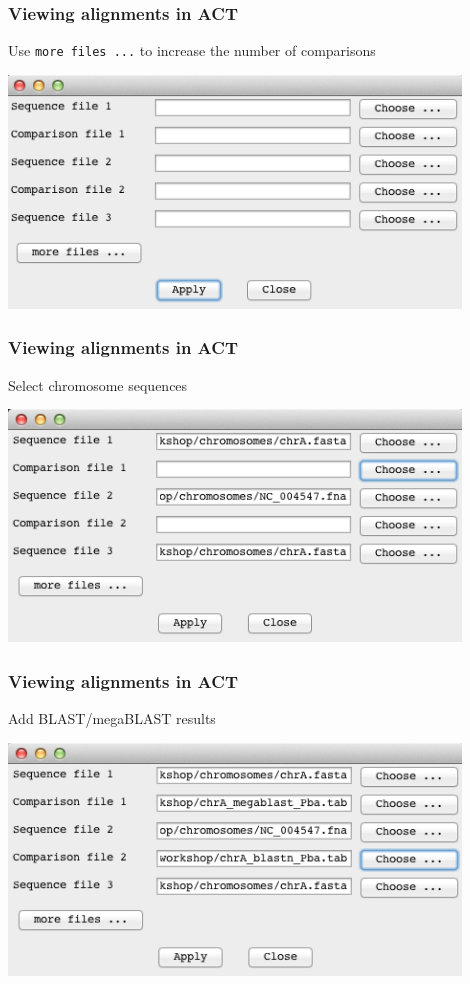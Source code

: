 \documentclass[table]{beamer}
\begin{document}
    \begin{frame}
      \frametitle{Viewing alignments in ACT}
      Use \texttt{more files ...} to increase the number of comparisons
      \begin{center}
        \includegraphics[width=0.9\textwidth]{images/act_wgs3}
      \end{center}
    \end{frame}

    \begin{frame}
      \frametitle{Viewing alignments in ACT}
      Select chromosome sequences
      \begin{center}
        \includegraphics[width=0.9\textwidth]{images/act_wgs4}
      \end{center}
    \end{frame}

    \begin{frame}
      \frametitle{Viewing alignments in ACT}
      Add BLAST/megaBLAST results
      \begin{center}
        \includegraphics[width=0.9\textwidth]{images/act_wgs5}
      \end{center}
    \end{frame}
\end{document}
